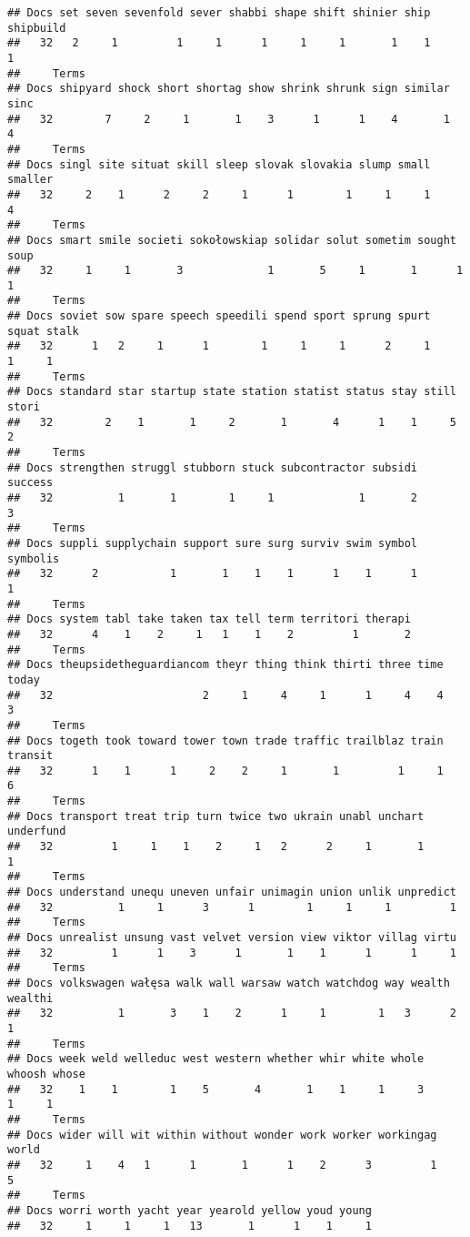 \documentclass[]{article}
\begin{document}
\begin{verbatim}
## Docs set seven sevenfold sever shabbi shape shift shinier ship shipbuild
##   32   2     1         1     1      1     1     1       1    1         1
##     Terms
## Docs shipyard shock short shortag show shrink shrunk sign similar sinc
##   32        7     2     1       1    3      1      1    4       1    4
##     Terms
## Docs singl site situat skill sleep slovak slovakia slump small smaller
##   32     2    1      2     2     1      1        1     1     1       4
##     Terms
## Docs smart smile societi sokołowskiap solidar solut sometim sought soup
##   32     1     1       3             1       5     1       1      1    1
##     Terms
## Docs soviet sow spare speech speedili spend sport sprung spurt squat stalk
##   32      1   2     1      1        1     1     1      2     1     1     1
##     Terms
## Docs standard star startup state station statist status stay still stori
##   32        2    1       1     2       1       4      1    1     5     2
##     Terms
## Docs strengthen struggl stubborn stuck subcontractor subsidi success
##   32          1       1        1     1             1       2       3
##     Terms
## Docs suppli supplychain support sure surg surviv swim symbol symbolis
##   32      2           1       1    1    1      1    1      1        1
##     Terms
## Docs system tabl take taken tax tell term territori therapi
##   32      4    1    2     1   1    1    2         1       2
##     Terms
## Docs theupsidetheguardiancom theyr thing think thirti three time today
##   32                       2     1     4     1      1     4    4     3
##     Terms
## Docs togeth took toward tower town trade traffic trailblaz train transit
##   32      1    1      1     2    2     1       1         1     1       6
##     Terms
## Docs transport treat trip turn twice two ukrain unabl unchart underfund
##   32         1     1    1    2     1   2      2     1       1         1
##     Terms
## Docs understand unequ uneven unfair unimagin union unlik unpredict
##   32          1     1      3      1        1     1     1         1
##     Terms
## Docs unrealist unsung vast velvet version view viktor villag virtu
##   32         1      1    3      1       1    1      1      1     1
##     Terms
## Docs volkswagen wałęsa walk wall warsaw watch watchdog way wealth wealthi
##   32          1       3    1    2      1     1        1   3      2       1
##     Terms
## Docs week weld welleduc west western whether whir white whole whoosh whose
##   32    1    1        1    5       4       1    1     1     3      1     1
##     Terms
## Docs wider will wit within without wonder work worker workingag world
##   32     1    4   1      1       1      1    2      3         1     5
##     Terms
## Docs worri worth yacht year yearold yellow youd young
##   32     1     1     1   13       1      1    1     1
\end{verbatim}
\end{document}
